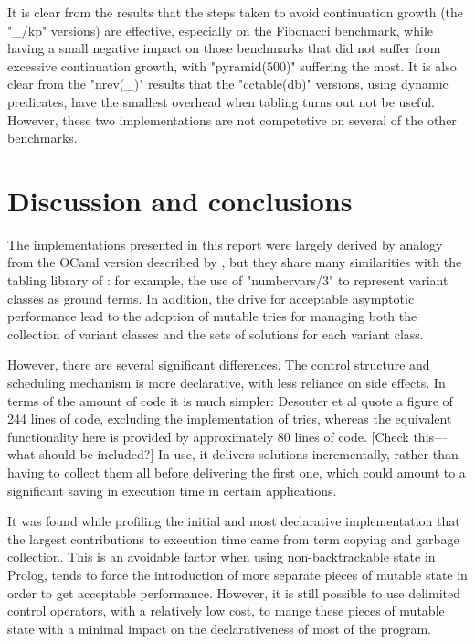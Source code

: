 It is clear from the results that the steps taken to avoid continuation
growth (the "_/kp" versions) are effective, especially on the Fibonacci benchmark, while having
a small negative impact on those benchmarks that did not suffer from excessive continuation
growth, with "pyramid(500)" suffering the most. It is also clear from the "nrev(_)" results
that the "cctable(db)" versions, using dynamic predicates, have the smallest overhead when
tabling turns out not be useful. However, these two implementations are not
competetive on several of the other benchmarks.

\section{Discussion and conclusions}

The implementations presented in this report were largely derived by analogy from the OCaml
version described by \cite{Abdallah2017a}, but they share many similarities with
the tabling library of \cite{DesouterVan-DoorenSchrijvers2015}: for example,
the use of "numbervars/3" to represent variant classes as ground terms. In
addition, the drive for acceptable asymptotic performance lead to the adoption
of mutable tries for managing both the collection of variant classes and the sets
of solutions for each variant class.

However, there are several significant differences.
The control structure and scheduling mechanism is more declarative, with less
reliance on side effects. In terms of the amount of code it is much simpler: Desouter
et al quote a figure of 244 lines of code, excluding the implementation of tries,
whereas the equivalent functionality here is provided by approximately 80 lines of code.
[Check this---what should be included?]
In use, it delivers solutions incrementally, rather than having to collect them all before 
delivering the first one, which could amount to a significant saving in execution time
in certain applications.

It was found while profiling the initial and most declarative implementation that the
largest contributions to execution time came from term copying and garbage collection.
This is an avoidable factor when using non-backtrackable state in Prolog, tends to force
the introduction of more separate pieces of mutable state in order to get acceptable
performance. However, it is still possible to use delimited control operators, with a relatively
low cost, to mange these pieces of mutable state with a minimal impact on the declarativeness
of most of the program.

